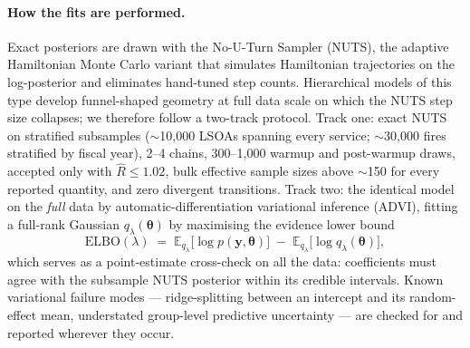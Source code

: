 \paragraph{How the fits are performed.} Exact posteriors are drawn with the
No-U-Turn Sampler (NUTS), the adaptive Hamiltonian Monte Carlo variant that
simulates Hamiltonian trajectories on the log-posterior and eliminates
hand-tuned step counts. Hierarchical models of this type develop funnel-shaped
geometry at full data scale on which the NUTS step size collapses; we therefore
follow a two-track protocol. Track one: exact NUTS on stratified subsamples
($\sim$10{,}000 LSOAs spanning every service; $\sim$30{,}000 fires stratified
by fiscal year), 2--4 chains, 300--1{,}000 warmup and post-warmup draws,
accepted only with $\hat{R} \le 1.02$, bulk effective sample sizes above
$\sim$150 for every reported quantity, and zero divergent transitions. Track
two: the identical model on the \emph{full} data by automatic-differentiation
variational inference (ADVI), fitting a full-rank Gaussian
$q_{\lambda}(\boldsymbol\theta)$ by maximising the evidence lower bound
\begin{equation}
  \mathrm{ELBO}(\lambda) \;=\;
  \mathbb{E}_{q_\lambda}\big[\log p(\mathbf{y}, \boldsymbol\theta)\big]
  \;-\; \mathbb{E}_{q_\lambda}\big[\log q_\lambda(\boldsymbol\theta)\big],
  \label{eq:elbo}
\end{equation}
which serves as a point-estimate cross-check on all the data: coefficients must
agree with the subsample NUTS posterior within its credible intervals. Known
variational failure modes --- ridge-splitting between an intercept and its
random-effect mean, understated group-level predictive uncertainty --- are
checked for and reported wherever they occur.

